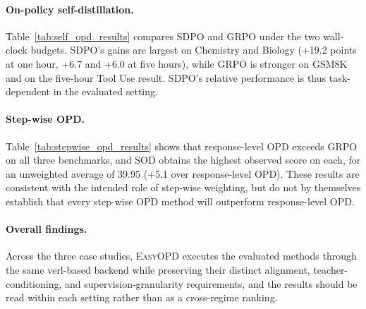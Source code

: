 



\paragraph{On-policy self-distillation.}
Table~\ref{tab:self_opd_results} compares SDPO and GRPO under the two wall-clock budgets. SDPO's gains are largest on Chemistry and Biology (+19.2 points at one hour, +6.7 and +6.0 at five hours), while GRPO is stronger on GSM8K and on the five-hour Tool Use result. SDPO's relative performance is thus task-dependent in the evaluated setting.

\paragraph{Step-wise OPD.}
Table~\ref{tab:stepwise_opd_results} shows that response-level OPD exceeds GRPO on all three benchmarks, and SOD obtains the highest observed score on each, for an unweighted average of 39.95 (+5.1 over response-level OPD). These results are consistent with the intended role of step-wise weighting, but do not by themselves establish that every step-wise OPD method will outperform response-level OPD.

\paragraph{Overall findings.}
Across the three case studies, \textsc{EasyOPD} executes the evaluated methods through the same verl-based backend while preserving their distinct alignment, teacher-conditioning, and supervision-granularity requirements, and the results should be read within each setting rather than as a cross-regime ranking.
